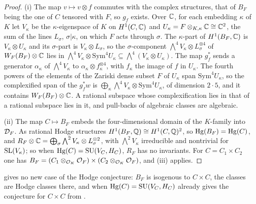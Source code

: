 \begin{proof}
(i) The map $v\mapsto v\otimes f$ commutes with the complex structures, that of
$B_{F}$ being the one of $C$ tensored with $F$, so $g_{f}$ exists. Over $\mathbb{C}$,
for each embedding $\kappa$ of $K$ let $V_{\kappa}$ be the $\kappa$-eigenspace
of $K$ on $H^{1}(C,\mathbb{C})$ and $U_{\kappa}=F\otimes_{K,\kappa}\mathbb{C}\cong\mathbb{C}^{2}$, the
sum of the lines $L_{\sigma}$, $\sigma|\kappa$, on which $F$ acts through
$\sigma$. The $\kappa$-part of $H^{1}(B_{F},\mathbb{C})$ is $V_{\kappa}\otimes
U_{\kappa}$ and its $\sigma$-part is $V_{\kappa}\otimes L_{\sigma}$, so the
$\sigma$-component $\bigwedge^{4}V_{\kappa}\otimes L_{\sigma}^{\otimes4}$ of
$W_{F}(B_{F})\otimes\mathbb{C}$ lies in $\bigwedge^{4}V_{\kappa}\otimes
\mathrm{Sym}^{4}U_{\kappa}\subseteq\bigwedge^{4}(V_{\kappa}\otimes U_{\kappa})$.
The map $g_{f}^{*}$ sends a generator $\alpha_{\kappa}$ of $\bigwedge^{4}V_{\kappa}$
to $\alpha_{\kappa}\otimes f_{\kappa}^{\otimes4}$, with $f_{\kappa}$ the image
of $f$ in $U_{\kappa}$. The fourth powers of the elements of the Zariski
dense subset $F$ of $U_{\kappa}$ span $\mathrm{Sym}^{4}U_{\kappa}$, so the
complexified span of the $g_{f}^{*}w$ is $\bigoplus_{\kappa}\bigwedge^{4}V_{\kappa}
\otimes\mathrm{Sym}^{4}U_{\kappa}$, of dimension $2\cdot5$, and it contains
$W_{F}(B_{F})\otimes\mathbb{C}$. A rational subspace whose complexification lies in
that of a rational subspace lies in it, and pull-backs of algebraic classes
are algebraic.

(ii) The map $C\mapsto B_{F}$ embeds the four-dimensional domain of the
$K$-family into $\mathcal{D}_{F}$. As rational Hodge structures
$H^{1}(B_{F},\mathbb{Q})\cong H^{1}(C,\mathbb{Q})^{2}$, so $\operatorname{Hg}(B_{F})=\operatorname{Hg}(C)$, and
$R_{F}\otimes\mathbb{C}=\bigoplus_{\sigma}\bigwedge^{2}V_{\kappa}\otimes
L_{\sigma}^{\otimes2}$, with $\bigwedge^{2}V_{\kappa}$ irreducible and
nontrivial for $\operatorname{SL}(V_{\kappa})$; so when $\operatorname{Hg}(C)=\operatorname{SU}(V_{C},H_{C})$, $R_{F}$
has no invariants. For $C=C_{1}\times C_{2}$ one has
$B_{F}=(C_{1}\otimes_{\mathcal{O}_{K}}\mathcal{O}_{F})\times(C_{2}\otimes_{\mathcal{O}_{K}}\mathcal{O}_{F})$, and
(iii) applies.
\end{proof}

 gives no new case of the Hodge conjecture: $B_{F}$ is
isogenous to $C\times C$, the classes are Hodge classes there, and when
$\operatorname{Hg}(C)=\operatorname{SU}(V_{C},H_{C})$ \cite[Proposition~2.24]{paperIII} already gives the conjecture for
$C\times C$ from \cite{Mar25a}.

